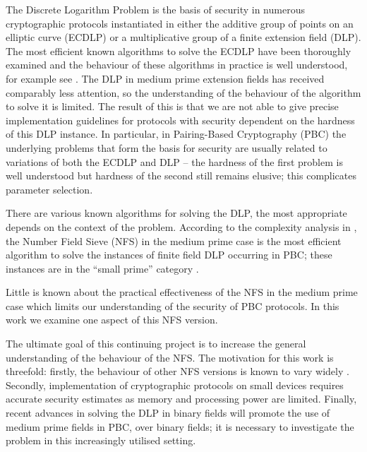 \documentclass[a4paper, 12pt, envcountsect, runningheads]{llncs}
\numberwithin{figure}{section}
\numberwithin{equation}{section}
\begin{document}
The Discrete Logarithm Problem is the basis of security in numerous cryptographic protocols instantiated in either the additive group of points on an elliptic curve (ECDLP) or a multiplicative group of a finite extension field (DLP). 
The most efficient known algorithms to solve the ECDLP have been thoroughly examined and the behaviour of these algorithms in practice is well understood, for example see \cite{pollard,teske,rho_chal_1,rho_chal_2,rho_efficiency}. The DLP in medium prime extension fields has received comparably less attention, so the understanding of the behaviour of the algorithm to solve it is limited. The result of this is that we are not able to give precise implementation guidelines for protocols with security dependent on the hardness of this DLP instance. In particular, in Pairing-Based Cryptography (PBC) the underlying problems that form the basis for security are usually related to variations of both the ECDLP and DLP -- the hardness of the first problem is well understood but hardness of the second still remains elusive; this complicates parameter selection.


There are various known algorithms for solving the DLP, the most appropriate depends on the context of the problem. According to the complexity analysis in \cite{joux-lercier-smart-vercauteren06}, the Number Field Sieve (NFS) in the medium prime case is the most efficient algorithm to solve the instances of finite field DLP occurring in PBC; these instances are in the ``small prime'' category \cite[Section 3.1]{joux-lercier-smart-vercauteren06}. 

Little is known about the practical effectiveness of the NFS in the medium prime case which limits our understanding of the security of PBC protocols. In this work we examine one aspect of this NFS version.

The ultimate goal of this continuing project is to increase the general understanding of the behaviour of the NFS. The motivation for this work is threefold: firstly, the behaviour of other NFS versions is known to vary widely \cite{zajac,dan_predicting_nfs}. Secondly, implementation of cryptographic protocols on small devices requires accurate security estimates as memory and processing power are limited. Finally, recent advances in solving the DLP in binary fields \cite{FFS_rob, FFS_antoine, joux_imporved} will promote the use of medium prime fields in PBC, over binary fields; it is necessary to investigate the problem in this increasingly utilised setting.
\end{document}
